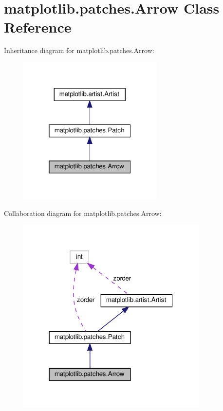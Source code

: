 \hypertarget{classmatplotlib_1_1patches_1_1Arrow}{}\section{matplotlib.\+patches.\+Arrow Class Reference}
\label{classmatplotlib_1_1patches_1_1Arrow}


Inheritance diagram for matplotlib.\+patches.\+Arrow\+:
\nopagebreak
\begin{figure}[H]
\begin{center}
\leavevmode
\includegraphics[width=205pt]{classmatplotlib_1_1patches_1_1Arrow__inherit__graph}
\end{center}
\end{figure}


Collaboration diagram for matplotlib.\+patches.\+Arrow\+:
\nopagebreak
\begin{figure}[H]
\begin{center}
\leavevmode
\includegraphics[width=270pt]{classmatplotlib_1_1patches_1_1Arrow__coll__graph}
\end{center}
\end{figure}
